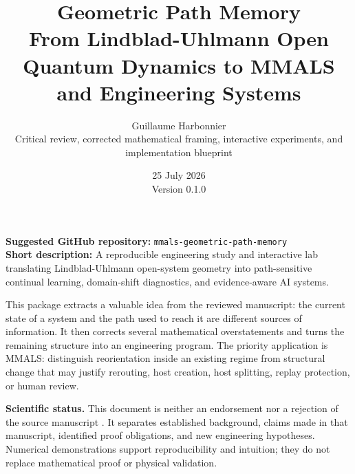 \documentclass[11pt,a4paper]{article}
\title{\vspace{-1.2cm}\textbf{Geometric Path Memory}\\[0.3cm]
\Large From Lindblad-Uhlmann Open Quantum Dynamics to MMALS and Engineering Systems}
\author{Guillaume Harbonnier\\\small Critical review, corrected mathematical framing, interactive experiments, and implementation blueprint}
\date{25 July 2026\\\small Version 0.1.0}
\begin{document}
\maketitle
\begin{center}
\begin{minipage}{0.92\textwidth}
\small
\textbf{Suggested GitHub repository:} \texttt{mmals-geometric-path-memory}\\
\textbf{Short description:} A reproducible engineering study and interactive lab translating Lindblad-Uhlmann open-system geometry into path-sensitive continual learning, domain-shift diagnostics, and evidence-aware AI systems.
\end{minipage}
\end{center}

\begin{executivebox}
This package extracts a valuable idea from the reviewed manuscript: the current state of a system and the path used to reach it are different sources of information. It then corrects several mathematical overstatements and turns the remaining structure into an engineering program. The priority application is MMALS: distinguish reorientation inside an existing regime from structural change that may justify rerouting, host creation, host splitting, replay protection, or human review.
\end{executivebox}

\vspace{0.2cm}
\noindent\textbf{Scientific status.} This document is neither an endorsement nor a rejection of the source manuscript \citep{elmorsalani2026}. It separates established background, claims made in that manuscript, identified proof obligations, and new engineering hypotheses. Numerical demonstrations support reproducibility and intuition; they do not replace mathematical proof or physical validation.

\tableofcontents
\newpage








\end{document}
